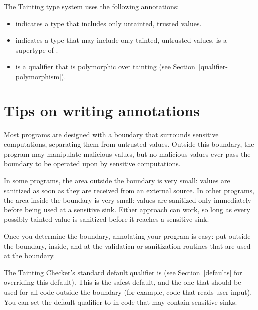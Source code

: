 
The Tainting type system uses the following annotations:
\begin{itemize}
\item
   indicates
  a type that includes only untainted, trusted values.
\item
   indicates
  a type that may include only tainted, untrusted values.
   is a supertype of .
\item
   is a qualifier that is
  polymorphic over tainting (see Section~\ref{qualifier-polymorphism}).
\end{itemize}


\section{Tips on writing  annotations\label{writing-untainted}}

Most programs are designed with a boundary that surrounds sensitive
computations, separating them from untrusted values.  Outside this
boundary, the program may manipulate malicious values, but no malicious
values ever pass the boundary to be operated upon by sensitive
computations.

In some programs, the area outside the boundary is very small:  values are
sanitized as soon as they are received from an external source.  In other
programs, the area inside the boundary is very small:  values are sanitized
only immediately before being used at a sensitive sink.  Either approach
can work, so long as every possibly-tainted value is sanitized before it
reaches a sensitive sink.

Once you determine the boundary, annotating your program is easy:  put
 outside the boundary,  inside, and
 at the validation or
sanitization routines that are used at the boundary.

The Tainting Checker's standard default qualifier is  (see
Section~\ref{defaults} for overriding this default).  This is the safest
default, and the one that should be used for all code outside the boundary
(for example, code that reads user input).  You can set the default
qualifier to  in code that may contain sensitive sinks.

